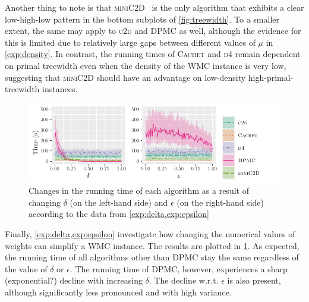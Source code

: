 \documentclass[runningheads]{llncs}
\begin{document}
Another thing to note is that \textsc{miniC2D}~\cite{DBLP:conf/ijcai/OztokD15}
is the only algorithm that exhibits a clear low-high-low pattern in the bottom
subplots of \cref{fig:treewidth}. To a smaller extent, the same may apply to
\textsc{c2d} and \textsc{DPMC} as well, although the evidence for this is
limited due to relatively large gaps between different values of $\mu$ in
\cref{exp:density}. In contrast, the running times of \textsc{Cachet} and
\textsc{d4} remain dependent on primal treewidth even when the density of the
\textsf{WMC} instance is very low, suggesting that \textsc{miniC2D} should have
an advantage on low-density high-primal-treewidth instances.

\begin{figure}[t]
  \centering
  \includegraphics{delta_epsilon}
  \caption{Changes in the running time of each algorithm as a result of changing
    $\delta$ (on the left-hand side) and $\epsilon$ (on the right-hand side)
    according to the data from
    \cref{exp:delta,exp:epsilon}}\label{fig:delta_epsilon}
\end{figure}

Finally, \cref{exp:delta,exp:epsilon} investigate how changing the numerical
values of weights can simplify a \textsf{WMC} instance. The results are plotted
in \cref{fig:delta_epsilon}. As expected, the running time of all algorithms
other than \textsc{DPMC} stay the same regardless of the value of $\delta$ or
$\epsilon$. The running time of \textsc{DPMC}, however, experiences a sharp
(exponential?) decline with increasing $\delta$. The decline w.r.t. $\epsilon$
is also present, although significantly less pronounced and with high variance.
\end{document}
